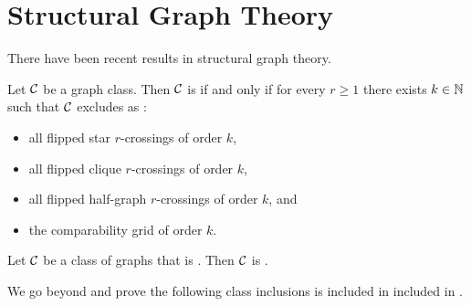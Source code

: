 \section{Structural Graph Theory}

There have been recent results in structural graph theory.

\begin{theorem}
    \label{monadically-dependent-patterns:thm}
    Let $\mathcal{C}$ be a graph class. Then $\mathcal{C}$ is 
    if and only if for every $r \geq 1$ there exists $k \in \mathbb{N}$ such that
    $\mathcal{C}$ excludes as :
    \begin{itemize}
        \item all flipped star $r$-crossings of order $k$,
        \item all flipped clique $r$-crossings of order $k$,
        \item all flipped half-graph $r$-crossings of order $k$, and
        \item the comparability grid of order $k$.
    \end{itemize}
\end{theorem}

\begin{corollary}
    \label{wqo-mon-independent:cor}
    Let $\mathcal{C}$ be a class of graphs that is 
    . 
    Then $\mathcal{C}$ is .
\end{corollary}

We go beyond and prove the following class inclusions  is
included in  included in
.
